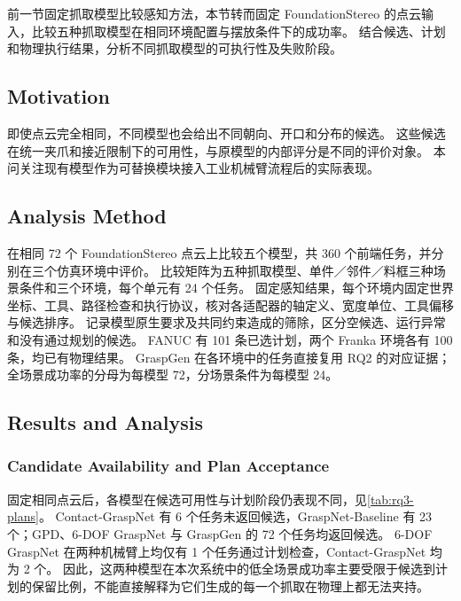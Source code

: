 \documentclass[UTF8,fontset=fandol,a4paper,11pt]{ctexart}
\newcommand{\qyb}[1]{#1}
\begin{document}
前一节固定抓取模型比较感知方法，本节转而固定 FoundationStereo 的点云输入，比较五种抓取模型在相同环境配置与摆放条件下的成功率。
结合候选、计划和物理执行结果，分析不同抓取模型的可执行性及失败阶段。

\subsection{\qyb{Motivation}}

即使点云完全相同，不同模型也会给出不同朝向、开口和分布的候选。
这些候选在统一夹爪和接近限制下的可用性，与原模型的内部评分是不同的评价对象。
本问关注现有模型作为可替换模块接入工业机械臂流程后的实际表现。

\subsection{\qyb{Analysis Method}}

在相同 72 个 FoundationStereo 点云上比较五个模型，共 360 个前端任务，并分别在三个仿真环境中评价。
比较矩阵为五种抓取模型、单件／邻件／料框三种场景条件和三个环境，每个单元有 24 个任务。
固定感知结果，每个环境内固定世界坐标、工具、路径检查和执行协议，核对各适配器的轴定义、宽度单位、工具偏移与候选排序。
记录模型原生要求及共同约束造成的筛除，区分空候选、运行异常和没有通过规划的候选。
FANUC 有 101 条已选计划，两个 Franka 环境各有 100 条，均已有物理结果。
GraspGen 在各环境中的任务直接复用 RQ2 的对应证据；全场景成功率的分母为每模型 72，分场景条件为每模型 24。

\subsection{\qyb{Results and Analysis}}

\subsubsection{Candidate Availability and Plan Acceptance}


固定相同点云后，各模型在候选可用性与计划阶段仍表现不同，见\cref{tab:rq3-plans}。
Contact-GraspNet 有 6 个任务未返回候选，GraspNet-Baseline 有 23 个；GPD、6-DOF GraspNet 与 GraspGen 的 72 个任务均返回候选。
6-DOF GraspNet 在两种机械臂上均仅有 1 个任务通过计划检查，Contact-GraspNet 均为 2 个。
因此，这两种模型在本次系统中的低全场景成功率主要受限于候选到计划的保留比例，不能直接解释为它们生成的每一个抓取在物理上都无法夹持。
\end{document}
